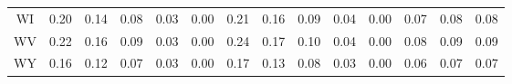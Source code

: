 \begin{table}
\begin{tabular}{cccccccccccccc}
   WI &  0.20 &  0.14 &  0.08 &  0.03 &  0.00 &  0.21 &  0.16 &  0.09 &  0.04 &  0.00 &    0.07 &     0.08 &      0.08 \\
   WV &  0.22 &  0.16 &  0.09 &  0.03 &  0.00 &  0.24 &  0.17 &  0.10 &  0.04 &  0.00 &    0.08 &     0.09 &      0.09 \\
   WY &  0.16 &  0.12 &  0.07 &  0.03 &  0.00 &  0.17 &  0.13 &  0.08 &  0.03 &  0.00 &    0.06 &     0.07 &      0.07 \\
\bottomrule
\end{tabular}
\end{table}
